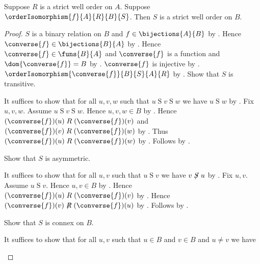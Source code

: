 \begin{theorem}\label{order_isomorphism_preserves_strict_well_order}
    Suppose $R$ is a strict well order on $A$.
    Suppose $\orderIsomorphism{f}{A}{R}{B}{S}$.
    Then $S$ is a strict well order on $B$.
\end{theorem}
\begin{proof}
    $S$ is a binary relation on $B$ and $f\in\bijections{A}{B}$
        by .
    Hence $\converse{f}\in\bijections{B}{A}$
        by .
    Hence $\converse{f}\in\funs{B}{A}$ and
        $\converse{f}$ is a function and $\dom{\converse{f}}=B$
        by
        .
    $\converse{f}$ is injective by .
    $\orderIsomorphism{\converse{f}}{B}{S}{A}{R}$
        by .
    Show that $S$ is transitive.
    \begin{subproof}
        It suffices to show that for all $u,v,w$ such that
            $u\mathrel{S}v\mathrel{S}w$ we have $u\mathrel{S}w$
            by .
        Fix $u,v,w$.
        Assume $u\mathrel{S}v\mathrel{S}w$.
        Hence $u,v,w\in B$
            by .
        Hence $(\converse{f})(u)\mathrel{R}(\converse{f})(v)$ and
            $(\converse{f})(v)\mathrel{R}(\converse{f})(w)$
            by .
        Thus $(\converse{f})(u)\mathrel{R}(\converse{f})(w)$
            by
            .
        Follows by .
    \end{subproof}
    Show that $S$ is asymmetric.
    \begin{subproof}
        It suffices to show that for all $u,v$ such that $u\mathrel{S}v$
            we have $v\not\mathrel{S}u$ by .
        Fix $u,v$.
        Assume $u\mathrel{S}v$.
        Hence $u,v\in B$
            by .
        Hence $(\converse{f})(u)\mathrel{R}(\converse{f})(v)$
            by .
        Hence $(\converse{f})(v)\not\mathrel{R}(\converse{f})(u)$
            by
            .
        Follows by .
    \end{subproof}
    Show that $S$ is connex on $B$.
    \begin{subproof}
        It suffices to show that for all $u,v$ such that
            $u\in B$ and $v\in B$ and $u\neq v$ we have

\end{subproof}
\end{proof}
